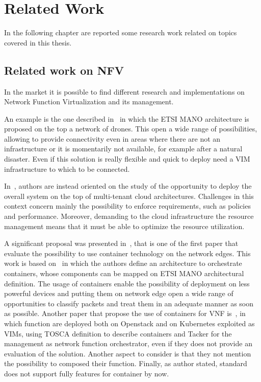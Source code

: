 \chapter{Related Work}
\label{chap:rel_wk}

In the following chapter are reported some research work related on topics
covered in this thesis. 

\section{Related work on NFV}
In the market it is possible to find different research and implementations on Network Function Virtualization and its management.

An example is the one described in~\cite{nogales2018nfv} in
which the ETSI MANO architecture is proposed on the top a network of drones.
This open a wide range of possibilities, allowing to provide connectivity even
in areas where there are not an infrastructure or it is momentarily not
available, for example after a natural disaster. Even if this solution is really
flexible and quick to deploy need a VIM infrastructure to which to be connected.

In~\cite{yu2015network}, authors are instead oriented on the study of the
opportunity to deploy the overall system on the top of multi-tenant cloud
architectures. Challenges in this context concern mainly the possibility to
enforce requirements, such as policies and performance. Moreover, demanding to
the cloud infrastructure the resource management means that it must be able to
optimize the resource utilization.

A significant proposal was presented in~\cite{cziva2017container}, that is one
of the first paper that evaluate the possibility to use container technology on
the network edges. This work is based on~\cite{cziva2015container} in which the
authors define an architecture to orchestrate containers, whose components can
be mapped on ETSI MANO architectural definition. The usage of containers enable
the possibility of deployment on less powerful devices and putting them on
network edge open a wide range of opportunities to classify packets and treat
them in an adequate manner as soon as possible. Another paper that propose the
use of containers for VNF is~\cite{hoang2018extended}, in which function are
deployed both on Openstack and on Kubernetes exploited as VIMs, using TOSCA
definition to describe containers and Tacker for the management as network
function orchestrator, even if they does not provide an evaluation of the
solution. Another aspect to consider is that they not mention the possibility to
composed their function. Finally, as author stated, standard does not support
fully features for container by now.


